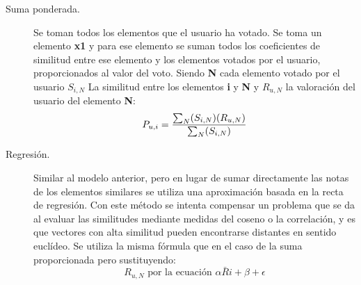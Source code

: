 \documentclass[12pt,letterpaper,oneside] {memoir}
\begin{document}
\begin{description}
\item [Suma ponderada.] Se toman todos los elementos que el usuario ha votado. Se toma un elemento \textbf{x1} y para ese elemento se suman todos los coeficientes de similitud entre ese elemento y los elementos votados por el usuario, proporcionados al valor del voto. Siendo \textbf{N} cada elemento votado por el usuario \textbf{$S_{i,N}$} La similitud entre los elementos \textbf{i} y \textbf{N} y \textbf{$R_{u,N}$} la valoración del usuario del elemento \textbf{N}:
\begin{equation}
\displaystyle P_{u,i}={ \sum_N (S_{i,N})(R_{u,N}) \over \sum_N (S_{i,N})} 
\end{equation}
\item [Regresión.] Similar al modelo anterior, pero en lugar de sumar directamente las notas de los elementos similares se utiliza una aproximación basada en la recta de regresión. Con este método se intenta compensar un problema que se da al evaluar las similitudes mediante medidas del coseno o la correlación, y es que vectores con alta similitud pueden encontrarse distantes en sentido euclídeo. Se utiliza la misma fórmula que en el caso de la suma proporcionada pero sustituyendo:
\begin{equation}
\displaystyle  R_{u,N} \mbox{ por la ecuación }  \alpha \bar{R} i + \beta + \epsilon
\end{equation}
\end{description}
\end{document}

